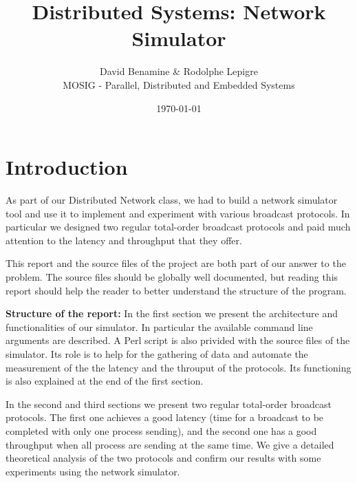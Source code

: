 \documentclass[a4paper]{article}
\begin{document}
\title{Distributed Systems: Network Simulator}
\author{David Benamine \& Rodolphe Lepigre\\ MOSIG - Parallel, Distributed and Embedded Systems}

\date{\today}
\maketitle%
\begin{center}
    \tableofcontents%
\end{center}
\newpage%



\section*{Introduction}
As part of our Distributed Network class, we had to build a network simulator
tool and use it to implement and experiment with various broadcast protocols.
In particular we designed two regular total-order broadcast protocols and paid
much attention to the latency and throughput that they offer.

This report and the source files of the project are both part of our answer to
the problem. The source files should be globally well documented, but reading
this report should help the reader to better understand the structure of the
program.
\bigskip

\noindent\textbf{Structure of the report:} In the first section we present the
architecture and functionalities of our simulator. In particular the available
command line arguments are described. A Perl script is also privided with the
source files of the simulator. Its role is to help for the gathering of data
and automate the measurement of the the latency and the throuput of the
protocols. Its functioning is also explained at the end of the first section.

In the second and third sections we present two regular total-order broadcast
protocols. The first one achieves a good latency (time for a broadcast to be
completed with only one process sending), and the second one has a good
throughput when all process are sending at the same time. We give a detailed
theoretical analysis of the two protocols and confirm our results with some
experiments using the network simulator.
\end{document}
